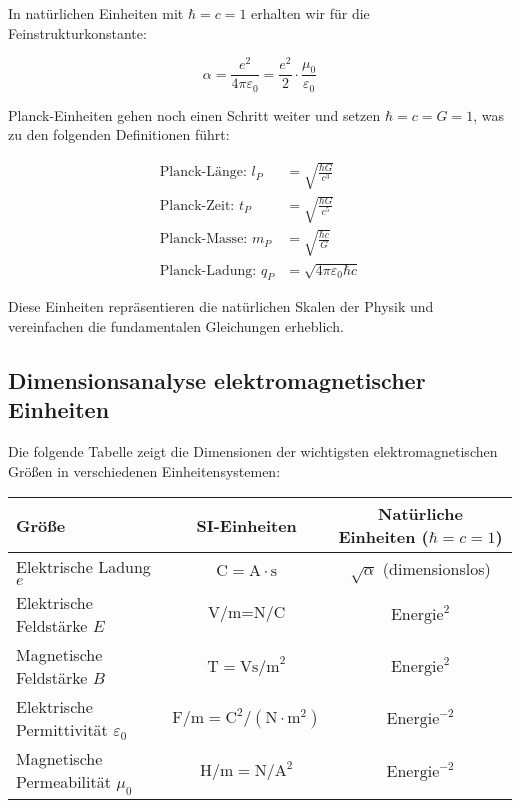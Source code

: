 \documentclass{article}
\begin{document}
	In natürlichen Einheiten mit $\hbar = c = 1$ erhalten wir für die Feinstrukturkonstante:
	
	\begin{equation}
		\alpha = \frac{e^2}{4\pi\varepsilon_0} = \frac{e^2}{2} \cdot \frac{\mu_0}{\varepsilon_0}
	\end{equation}
	
	Planck-Einheiten gehen noch einen Schritt weiter und setzen $\hbar = c = G = 1$, was zu den folgenden Definitionen führt:
	
	\begin{align}
		\text{Planck-Länge: } l_P &= \sqrt{\frac{\hbar G}{c^3}} \\
		\text{Planck-Zeit: } t_P &= \sqrt{\frac{\hbar G}{c^5}} \\
		\text{Planck-Masse: } m_P &= \sqrt{\frac{\hbar c}{G}} \\
		\text{Planck-Ladung: } q_P &= \sqrt{4\pi\varepsilon_0\hbar c}
	\end{align}
	
	Diese Einheiten repräsentieren die natürlichen Skalen der Physik und vereinfachen die fundamentalen Gleichungen erheblich.
	
	\subsection{Dimensionsanalyse elektromagnetischer Einheiten}
	
	Die folgende Tabelle zeigt die Dimensionen der wichtigsten elektromagnetischen Größen in verschiedenen Einheitensystemen:
	
	\begin{center}
		\begin{tabular}{|l|c|c|}
			\hline
			\textbf{Größe} & \textbf{SI-Einheiten} & \textbf{Natürliche Einheiten} ($\hbar = c = 1$) \\
			\hline
			Elektrische Ladung $e$ & $\text{C} = \text{A} \cdot \text{s}$ & $\sqrt{\alpha}$ (dimensionslos) \\
			Elektrische Feldstärke $E$ & $\text{V/m} = \text{N/C}$ & $\text{Energie}^2$ \\
			Magnetische Feldstärke $B$ & $\text{T} = \text{Vs/m}^2$ & $\text{Energie}^2$ \\
			Elektrische Permittivität $\varepsilon_0$ & $\text{F/m} = \text{C}^2/(\text{N} \cdot \text{m}^2)$ & $\text{Energie}^{-2}$ \\
			Magnetische Permeabilität $\mu_0$ & $\text{H/m} = \text{N}/\text{A}^2$ & $\text{Energie}^{-2}$ \\
			\hline
		\end{tabular}
	\end{center}
	
\end{document}
